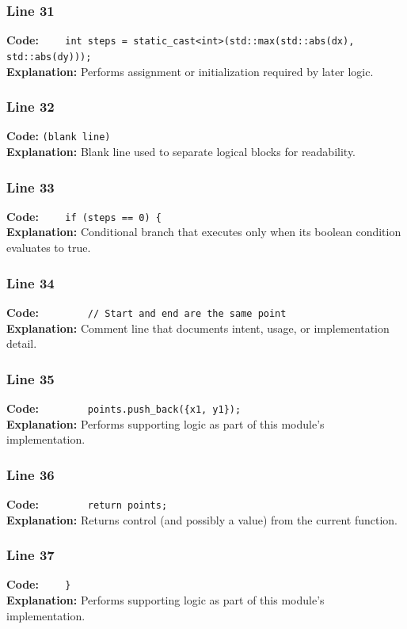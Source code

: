 \documentclass[11pt,a4paper]{article}
\begin{document}
\subsubsection*{Line 31}
\textbf{Code:} \verb|    int steps = static_cast<int>(std::max(std::abs(dx), std::abs(dy)));|\\
\textbf{Explanation:} Performs assignment or initialization required by later logic.

\subsubsection*{Line 32}
\textbf{Code:} \texttt{(blank line)}\\
\textbf{Explanation:} Blank line used to separate logical blocks for readability.

\subsubsection*{Line 33}
\textbf{Code:} \verb|    if (steps == 0) {|\\
\textbf{Explanation:} Conditional branch that executes only when its boolean condition evaluates to true.

\subsubsection*{Line 34}
\textbf{Code:} \verb|        // Start and end are the same point|\\
\textbf{Explanation:} Comment line that documents intent, usage, or implementation detail.

\subsubsection*{Line 35}
\textbf{Code:} \verb|        points.push_back({x1, y1});|\\
\textbf{Explanation:} Performs supporting logic as part of this module's implementation.

\subsubsection*{Line 36}
\textbf{Code:} \verb|        return points;|\\
\textbf{Explanation:} Returns control (and possibly a value) from the current function.

\subsubsection*{Line 37}
\textbf{Code:} \verb|    }|\\
\textbf{Explanation:} Performs supporting logic as part of this module's implementation.
\end{document}
